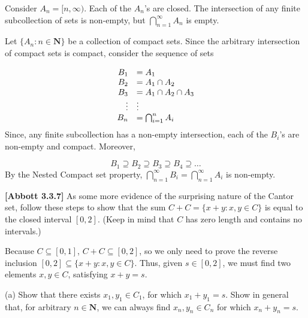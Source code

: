 \documentclass[10pt]{article}
\begin{document}
Consider $\displaystyle A_{n} =[ n,\infty )$. Each of the $\displaystyle A_{n}$'s are closed. The intersection of any finite subcollection of sets is non-empty, but $\displaystyle \bigcap _{n=1}^{\infty } A_{n}$ is empty.



Let $\displaystyle \{A_{n} :n\in \mathbf{N}\}$ be a collection of compact sets. Since the arbitrary intersection of compact sets is compact, consider the sequence of sets 


\begin{equation*}
\begin{array}{ r l }
B_{1} & =A_{1}\\
B_{2} & =A_{1} \cap A_{2}\\
B_{3} & =A_{1} \cap A_{2} \cap A_{3}\\
\vdots  & \vdots \\
B_{n} & =\bigcap _{i=1}^{n} A_{i}
\end{array}
\end{equation*}
 Since, any finite subcollection has a non-empty intersection, each of the $\displaystyle B_{i}$'s are non-empty and compact. Moreover, 




\begin{equation*}
B_{1} \supseteq B_{2} \supseteq B_{3} \supseteq B_{4} \supseteq \dotsc 
\end{equation*}
By the Nested Compact set property, $\displaystyle \bigcap _{n=1}^{\infty } B_{i} =\bigcap _{n=1}^{\infty } A_{i}$ is non-empty.



\textbf{[Abbott 3.3.7]} As some more evidence of the surprising nature of the Cantor set, follow these steps to show that the sum $\displaystyle C+C=\{x+y:x,y\in C\}$ is equal to the closed interval $\displaystyle [ 0,2]$. (Keep in mind that $\displaystyle C$ has zero length and contains no intervals.)



Because $\displaystyle C\subseteq [ 0,1]$, $\displaystyle C+C\subseteq [ 0,2]$, so we only need to prove the reverse inclusion $\displaystyle [ 0,2] \subseteq \{x+y:x,y\in C\}$. Thus, given $\displaystyle s\in [ 0,2]$, we must find two elements $\displaystyle x,y\in C$, satisfying $\displaystyle x+y=s$.



(a) Show that there exists $\displaystyle x_{1} ,y_{1} \in C_{1}$, for which $\displaystyle x_{1} +y_{1} =s$. Show in general that, for arbitrary $\displaystyle n\in \mathbf{N}$, we can always find $\displaystyle x_{n} ,y_{n} \in C_{n}$ for which $\displaystyle x_{n} +y_{n} =s$.
\end{document}
